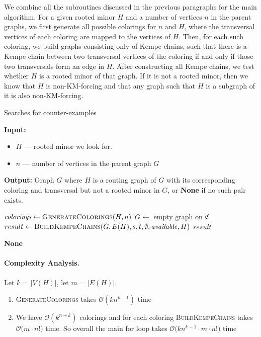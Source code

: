 We combine all the subroutines discussed in the previous paragraphs for the main algorithm. For a given rooted minor  
$H$ and a number of vertices $n$ in the parent graphs, we first generate all possible colorings for $n$ and $H$, where  
the transversal vertices of each coloring are mapped to the vertices of $H$. Then, for each such coloring, we build graphs consisting only  
of Kempe chains, such that there is a Kempe chain between two transversal vertices of the coloring if and only if those two transversals  
form an edge in $H$. After constructing all Kempe chains, we test whether $H$ is a rooted minor of that graph. If it is not a  
rooted minor, then we know that $H$ is non-KM-forcing and that any graph such that $H$ is a subgraph of it is also non-KM-forcing.

\begin{algorithm}[H]
    \caption{Searches for counter-examples}
    \label{alg:rooted_minor_search}
    \begin{algorithmic}[1]
      \Statex \textbf{Input:}
      \begin{itemize}
        \item $H$ — rooted minor we look for.
        \item $n$ — number of vertices in the parent graph $G$
      \end{itemize}
      \Statex \textbf{Output:} Graph $G$ where $H$ is a routing graph of $G$ with its corresponding coloring and transversal but not a rooted minor in $G$, or \textbf{None} if no such pair exists.
  
      \State $\textit{colorings} \gets \textsc{GenerateColorings}(H, n)$
        \State $G \gets$ empty graph on $\mathfrak{C}$
        \State $result \gets \textsc{BuildKempeChains}(G, E(H), s, t, \emptyset, \mathit{available}, H)$
          \State \Return $result$ 
        \EndIf
      \EndFor
  
      \State \Return \textbf{None} 
    \end{algorithmic}
  \end{algorithm}

\paragraph{Complexity Analysis.}
Let $k$ = $|V(H)|$, let $m$ = $|E(H)|$.
\begin{enumerate}
    \item \textsc{GenerateColorings} takes $\mathcal{O}(kn^{k-1})$ time
    \item We have $\mathcal{O}(k^{n+k})$ colorings and for each coloring \textsc{BuildKempeChains} takes $\mathcal{O}\bigl(m \cdot n!\bigr)$ time.
 So overall the main for loop takes $\mathcal{O}\bigl(kn^{k-1} \cdot m \cdot n!\bigr)$ time
\end{enumerate}


